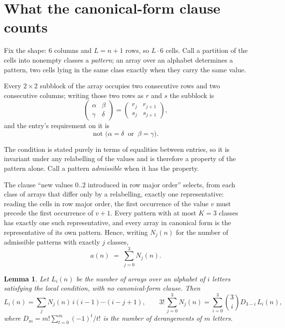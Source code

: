 \documentclass[11pt,a4paper]{article}
\theoremstyle{plain}
\newtheorem{lemma}[theorem]{Lemma}
\theoremstyle{definition}
\begin{document}
\section{What the canonical-form clause counts}

Fix the shape: $6$ columns and $L=n+1$ rows, so $L\cdot6$ cells. Call a
partition of the cells into nonempty classes a \emph{pattern}; an array over an alphabet
determines a pattern, two cells lying in the same class exactly when they carry the same
value.

Every $2\times2$ subblock of the array occupies two consecutive
rows and two consecutive columns; writing those two rows as $r$ and $s$ the
subblock is
\[
\begin{pmatrix}\alpha&\beta\\\gamma&\delta\end{pmatrix}=\begin{pmatrix}r_j&r_{j+1}\\s_j&s_{j+1}\end{pmatrix},
\]
and the entry's requirement on it is
\begin{equation}\label{eq:loc}
\text{not }\bigl(\alpha=\delta\ \text{ or }\ \beta=\gamma\bigr).
\end{equation}

The condition is stated purely in terms of equalities between entries, so it is invariant
under any relabelling of the values and is therefore a property of the pattern alone. Call a
pattern \emph{admissible} when it has the property.

The clause ``new values $0..2$ introduced in row major order'' selects, from each class
of arrays that differ only by a relabelling, exactly one representative: reading the cells in
row major order, the first occurrence of the value $v$ must precede the first occurrence of
$v+1$. Every pattern with at most $K=3$ classes has exactly one such representative, and
every array in canonical form is the representative of its own pattern. Hence, writing
$N_j(n)$ for the number of admissible patterns with exactly $j$ classes,
\begin{equation}\label{eq:apat}
a(n)\;=\;\sum_{j=0}^{3}N_j(n).
\end{equation}

\begin{lemma}\label{lem:inv}
Let $L_i(n)$ be the number of arrays over an alphabet of $i$ letters satisfying the local
condition, with no canonical-form clause. Then
\[
L_i(n)=\sum_j N_j(n)\,i(i-1)\cdots(i-j+1),
\qquad
3!\,\sum_{j=0}^{3}N_j(n)=\sum_{i=0}^{3}\binom{3}{i}D_{3-i}\,L_i(n),
\]
where $D_m=m!\sum_{t=0}^{m}(-1)^t/t!$ is the number of derangements of $m$ letters.
\end{lemma}
\end{document}
